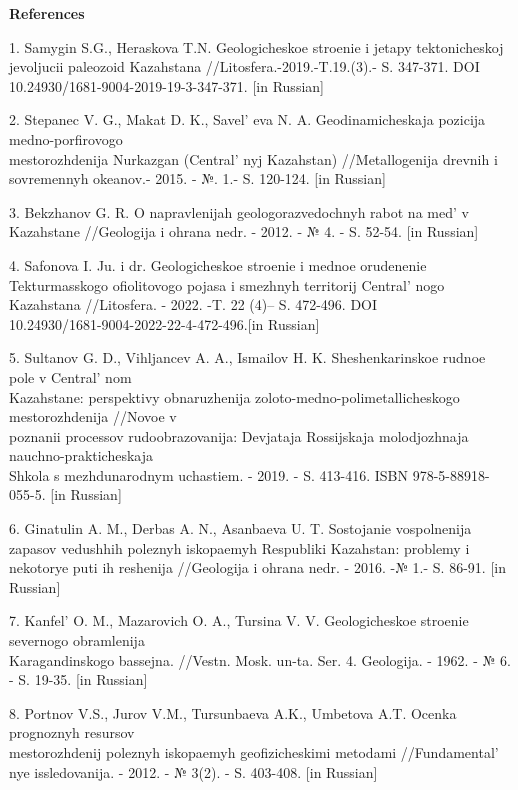 \begin{center}
{\bfseries References}
\end{center}

\begin{references}
1. Samygin S.G., Heraskova T.N. Geologicheskoe stroenie i jetapy
tektonicheskoj jevoljucii paleozoid Kazahstana
//Litosfera.-2019.-T.19.(3).- S. 347-371.
DOI 10.24930/1681-9004-2019-19-3-347-371. {[}in Russian{]}

2. Stepanec V. G., Makat D. K., Savel' eva N. A.
Geodinamicheskaja pozicija medno-porfirovogo \\mestorozhdenija Nurkazgan
(Central' nyj Kazahstan) //Metallogenija drevnih i
sovremennyh okeanov.- 2015. - №. 1.- S. 120-124. {[}in Russian{]}

3. Bekzhanov G. R. O napravlenijah geologorazvedochnyh rabot na
med'{} v Kazahstane //Geologija i ohrana nedr. - 2012. -
№ 4. - S. 52-54. {[}in Russian{]}

4. Safonova I. Ju. i dr. Geologicheskoe stroenie i mednoe orudenenie
Tekturmasskogo ofiolitovogo pojasa i smezhnyh territorij
Central' nogo Kazahstana //Litosfera. - 2022. -T. 22
(4)-- S. 472-496. DOI \\10.24930/1681-9004-2022-22-4-472-496.{[}in
Russian{]}

5. Sultanov G. D., Vihljancev A. A., Ismailov H. K. Sheshenkarinskoe
rudnoe pole v Central' nom \\Kazahstane: perspektivy
obnaruzhenija zoloto-medno-polimetallicheskogo mestorozhdenija //Novoe v\\
poznanii processov rudoobrazovanija: Devjataja Rossijskaja molodjozhnaja
nauchno-prakticheskaja \\Shkola s mezhdunarodnym uchastiem. - 2019. - S.
413-416. ISBN 978-5-88918-055-5. {[}in Russian{]}

6. Ginatulin A. M., Derbas A. N., Asanbaeva U. T. Sostojanie
vospolnenija zapasov vedushhih poleznyh iskopaemyh Respubliki Kazahstan:
problemy i nekotorye puti ih reshenija //Geologija i ohrana nedr. -
2016. -№ 1.- S. 86-91. {[}in Russian{]}

7. Kanfel'{} O. M., Mazarovich O. A., Tursina V. V.
Geologicheskoe stroenie severnogo obramlenija \\Karagandinskogo bassejna.
//Vestn. Mosk. un-ta. Ser. 4. Geologija. - 1962. - № 6. - S. 19-35.
{[}in Russian{]}

8. Portnov V.S., Jurov V.M., Tursunbaeva A.K., Umbetova A.T. Ocenka
prognoznyh resursov \\mestorozhdenij poleznyh iskopaemyh geofizicheskimi
metodami //Fundamental' nye issledovanija. - 2012. - №
3(2). - S. 403-408. {[}in Russian{]}


\end{references}
